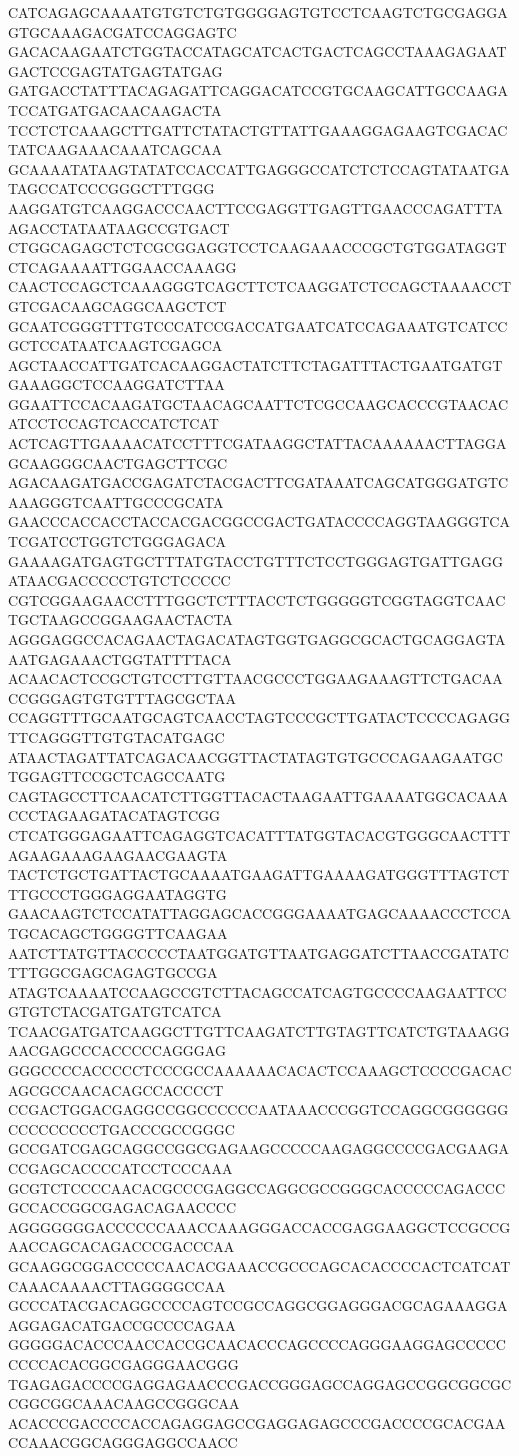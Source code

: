 CATCAGAGCAAAATGTGTCTGTGGGGAGTGTCCTCAAGTCTGCGAGGAGTGCAAAGACGATCCAGGAGTC
GACACAAGAATCTGGTACCATAGCATCACTGACTCAGCCTAAAGAGAATGACTCCGAGTATGAGTATGAG
GATGACCTATTTACAGAGATTCAGGACATCCGTGCAAGCATTGCCAAGATCCATGATGACAACAAGACTA
TCCTCTCAAAGCTTGATTCTATACTGTTATTGAAAGGAGAAGTCGACACTATCAAGAAACAAATCAGCAA
GCAAAATATAAGTATATCCACCATTGAGGGCCATCTCTCCAGTATAATGATAGCCATCCCGGGCTTTGGG
AAGGATGTCAAGGACCCAACTTCCGAGGTTGAGTTGAACCCAGATTTAAGACCTATAATAAGCCGTGACT
CTGGCAGAGCTCTCGCGGAGGTCCTCAAGAAACCCGCTGTGGATAGGTCTCAGAAAATTGGAACCAAAGG
CAACTCCAGCTCAAAGGGTCAGCTTCTCAAGGATCTCCAGCTAAAACCTGTCGACAAGCAGGCAAGCTCT
GCAATCGGGTTTGTCCCATCCGACCATGAATCATCCAGAAATGTCATCCGCTCCATAATCAAGTCGAGCA
AGCTAACCATTGATCACAAGGACTATCTTCTAGATTTACTGAATGATGTGAAAGGCTCCAAGGATCTTAA
GGAATTCCACAAGATGCTAACAGCAATTCTCGCCAAGCACCCGTAACACATCCTCCAGTCACCATCTCAT
ACTCAGTTGAAAACATCCTTTCGATAAGGCTATTACAAAAAACTTAGGAGCAAGGGCAACTGAGCTTCGC
AGACAAGATGACCGAGATCTACGACTTCGATAAATCAGCATGGGATGTCAAAGGGTCAATTGCCCGCATA
GAACCCACCACCTACCACGACGGCCGACTGATACCCCAGGTAAGGGTCATCGATCCTGGTCTGGGAGACA
GAAAAGATGAGTGCTTTATGTACCTGTTTCTCCTGGGAGTGATTGAGGATAACGACCCCCTGTCTCCCCC
CGTCGGAAGAACCTTTGGCTCTTTACCTCTGGGGGTCGGTAGGTCAACTGCTAAGCCGGAAGAACTACTA
AGGGAGGCCACAGAACTAGACATAGTGGTGAGGCGCACTGCAGGAGTAAATGAGAAACTGGTATTTTACA
ACAACACTCCGCTGTCCTTGTTAACGCCCTGGAAGAAAGTTCTGACAACCGGGAGTGTGTTTAGCGCTAA
CCAGGTTTGCAATGCAGTCAACCTAGTCCCGCTTGATACTCCCCAGAGGTTCAGGGTTGTGTACATGAGC
ATAACTAGATTATCAGACAACGGTTACTATAGTGTGCCCAGAAGAATGCTGGAGTTCCGCTCAGCCAATG
CAGTAGCCTTCAACATCTTGGTTACACTAAGAATTGAAAATGGCACAAACCCTAGAAGATACATAGTCGG
CTCATGGGAGAATTCAGAGGTCACATTTATGGTACACGTGGGCAACTTTAGAAGAAAGAAGAACGAAGTA
TACTCTGCTGATTACTGCAAAATGAAGATTGAAAAGATGGGTTTAGTCTTTGCCCTGGGAGGAATAGGTG
GAACAAGTCTCCATATTAGGAGCACCGGGAAAATGAGCAAAACCCTCCATGCACAGCTGGGGTTCAAGAA
AATCTTATGTTACCCCCTAATGGATGTTAATGAGGATCTTAACCGATATCTTTGGCGAGCAGAGTGCCGA
ATAGTCAAAATCCAAGCCGTCTTACAGCCATCAGTGCCCCAAGAATTCCGTGTCTACGATGATGTCATCA
TCAACGATGATCAAGGCTTGTTCAAGATCTTGTAGTTCATCTGTAAAGGAACGAGCCCACCCCCAGGGAG
GGGCCCCACCCCCTCCCGCCAAAAAACACACTCCAAAGCTCCCCGACACAGCGCCAACACAGCCACCCCT
CCGACTGGACGAGGCCGGCCCCCCAATAAACCCGGTCCAGGCGGGGGGCCCCCCCCCTGACCCGCCGGGC
GCCGATCGAGCAGGCCGGCGAGAAGCCCCCAAGAGGCCCCGACGAAGACCGAGCACCCCATCCTCCCAAA
GCGTCTCCCCAACACGCCCGAGGCCAGGCGCCGGGCACCCCCAGACCCGCCACCGGCGAGACAGAACCCC
AGGGGGGGACCCCCCAAACCAAAGGGACCACCGAGGAAGGCTCCGCCGAACCAGCACAGACCCGACCCAA
GCAAGGCGGACCCCCAACACGAAACCGCCCAGCACACCCCACTCATCATCAAACAAAACTTAGGGGCCAA
GCCCATACGACAGGCCCCAGTCCGCCAGGCGGAGGGACGCAGAAAGGAAGGAGACATGACCGCCCCAGAA
GGGGGACACCCAACCACCGCAACACCCAGCCCCAGGGAAGGAGCCCCCCCCCACACGGCGAGGGAACGGG
TGAGAGACCCCGAGGAGAACCCGACCGGGAGCCAGGAGCCGGCGGCGCCGGCGGCAAACAAGCCGGGCAA
ACACCCGACCCCACCAGAGGAGCCGAGGAGAGCCCGACCCCGCACGAACCAAACGGCAGGGAGGCCAACC
